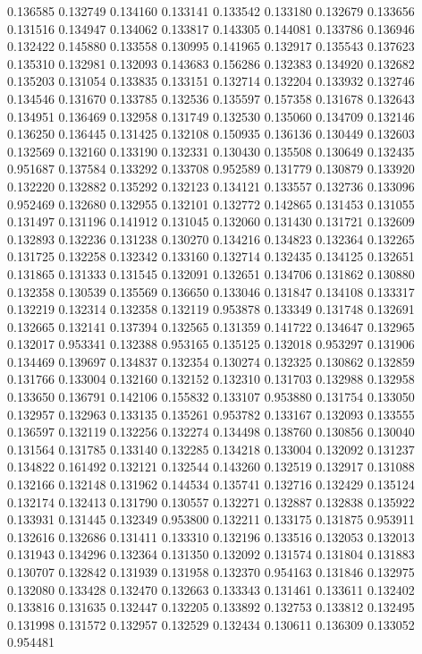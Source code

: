 0.136585
0.132749
0.134160
0.133141
0.133542
0.133180
0.132679
0.133656
0.131516
0.134947
0.134062
0.133817
0.143305
0.144081
0.133786
0.136946
0.132422
0.145880
0.133558
0.130995
0.141965
0.132917
0.135543
0.137623
0.135310
0.132981
0.132093
0.143683
0.156286
0.132383
0.134920
0.132682
0.135203
0.131054
0.133835
0.133151
0.132714
0.132204
0.133932
0.132746
0.134546
0.131670
0.133785
0.132536
0.135597
0.157358
0.131678
0.132643
0.134951
0.136469
0.132958
0.131749
0.132530
0.135060
0.134709
0.132146
0.136250
0.136445
0.131425
0.132108
0.150935
0.136136
0.130449
0.132603
0.132569
0.132160
0.133190
0.132331
0.130430
0.135508
0.130649
0.132435
0.951687
0.137584
0.133292
0.133708
0.952589
0.131779
0.130879
0.133920
0.132220
0.132882
0.135292
0.132123
0.134121
0.133557
0.132736
0.133096
0.952469
0.132680
0.132955
0.132101
0.132772
0.142865
0.131453
0.131055
0.131497
0.131196
0.141912
0.131045
0.132060
0.131430
0.131721
0.132609
0.132893
0.132236
0.131238
0.130270
0.134216
0.134823
0.132364
0.132265
0.131725
0.132258
0.132342
0.133160
0.132714
0.132435
0.134125
0.132651
0.131865
0.131333
0.131545
0.132091
0.132651
0.134706
0.131862
0.130880
0.132358
0.130539
0.135569
0.136650
0.133046
0.131847
0.134108
0.133317
0.132219
0.132314
0.132358
0.132119
0.953878
0.133349
0.131748
0.132691
0.132665
0.132141
0.137394
0.132565
0.131359
0.141722
0.134647
0.132965
0.132017
0.953341
0.132388
0.953165
0.135125
0.132018
0.953297
0.131906
0.134469
0.139697
0.134837
0.132354
0.130274
0.132325
0.130862
0.132859
0.131766
0.133004
0.132160
0.132152
0.132310
0.131703
0.132988
0.132958
0.133650
0.136791
0.142106
0.155832
0.133107
0.953880
0.131754
0.133050
0.132957
0.132963
0.133135
0.135261
0.953782
0.133167
0.132093
0.133555
0.136597
0.132119
0.132256
0.132274
0.134498
0.138760
0.130856
0.130040
0.131564
0.131785
0.133140
0.132285
0.134218
0.133004
0.132092
0.131237
0.134822
0.161492
0.132121
0.132544
0.143260
0.132519
0.132917
0.131088
0.132166
0.132148
0.131962
0.144534
0.135741
0.132716
0.132429
0.135124
0.132174
0.132413
0.131790
0.130557
0.132271
0.132887
0.132838
0.135922
0.133931
0.131445
0.132349
0.953800
0.132211
0.133175
0.131875
0.953911
0.132616
0.132686
0.131411
0.133310
0.132196
0.133516
0.132053
0.132013
0.131943
0.134296
0.132364
0.131350
0.132092
0.131574
0.131804
0.131883
0.130707
0.132842
0.131939
0.131958
0.132370
0.954163
0.131846
0.132975
0.132080
0.133428
0.132470
0.132663
0.133343
0.131461
0.133611
0.132402
0.133816
0.131635
0.132447
0.132205
0.133892
0.132753
0.133812
0.132495
0.131998
0.131572
0.132957
0.132529
0.132434
0.130611
0.136309
0.133052
0.954481
